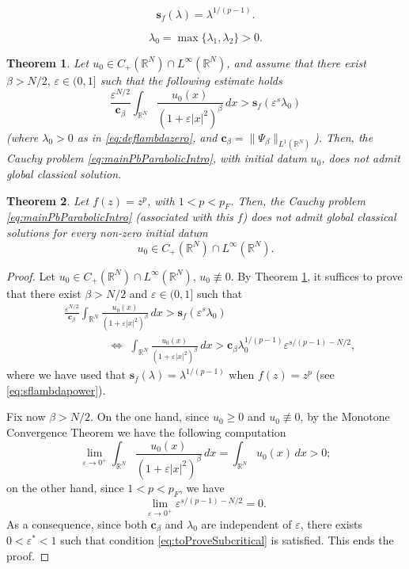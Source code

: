 \documentclass[10pt,a4paper]{amsart}
\newtheorem{theorem}{Theorem}
\def \R {\mathbb{R}}
\def \RN {\mathbb{R}^N}
\def \e {\varepsilon}
\begin{document}
\begin{equation} \label{eq:sflambdapower}
\mathbf{s}_f(\lambda) = \lambda^{1/(p-1)}.
\end{equation}

\begin{equation} \label{eq:deflambdazero}
\lambda_0 =  \max\{\lambda_1,\lambda_2\}> 0.	
\end{equation}

\begin{theorem} \label{thm:NonexistenceExplicit}
	Let $u_0\in C_+(\mathbb{R}^N)\cap L^\infty(\mathbb{R}^N)$, and assume that there exist $\beta > N/2,\,\e\in(0,1]$ such that the following
	estimate holds
	\begin{equation} \label{eq:conditionKaplanExplicit}
		\frac{\e^{N/2}}{\mathbf{c}_\beta}\int_{\R^N}\frac{u_0(x)}{(1+\e|x|^2)^\beta}\,dx >\mathbf{s}_f(\e^s\lambda_0)
	\end{equation}
	\emph{(}where $\lambda_0 > 0$ as in \eqref{eq:deflambdazero}, and
	$\mathbf{c}_\beta = \|\Psi_\beta\|_{L^1(\R^N)}$\emph{)}. Then, the Cauchy problem \eqref{eq:mainPbParabolicIntro}, with initial datum $u_0$, does not admit global classical solution.
\end{theorem}

\begin{theorem}\label{teo3}
Let $f(z) = z^p$, with $1<p<p_F$. Then, the Cauchy problem \eqref{eq:mainPbParabolicIntro}
\emph{(}associated with this $f$\emph{)} does not admit global classical solutions \emph{for every non-zero initial datum}
$$u_0\in C_+(\mathbb{R}^N)\cap L^\infty(\mathbb{R}^N).$$
\end{theorem}

\begin{proof}
	Let $u_0\in C_+(\mathbb{R}^N)\cap L^\infty(\mathbb{R}^N),\,u_0\not\equiv 0$. By Theorem \ref{thm:NonexistenceExplicit}, it suffices to prove that there exist $\beta > N/2$ and $\varepsilon\in(0,1]$ such that\begin{equation}\label{eq:toProveSubcritical}
\begin{split}
& \frac{\e^{N/2}}{\mathbf{c}_\beta}\int_{\R^N}\frac{u_0(x)}{(1+\e|x|^2)^\beta}\,dx >\mathbf{s}_f(\e^s \lambda_0)\\
&\qquad\qquad\Longleftrightarrow\,\,
	\int_{\R^N}\frac{u_0(x)}{(1+\e|x|^2)^\beta}\,dx >\mathbf{c}_\beta \lambda_0^{1/(p-1)}\e^{s/(p-1)-N/2},
\end{split}	
\end{equation}
where we have used  that $\mathbf{s}_f(\lambda) = \lambda^{1/(p-1)}$ when $f(z) = z^p$ (see \eqref{eq:sflambdapower}).
\vspace{0.1cm}

Fix now $\beta > N/2$. On the one hand, since $u_0\geq 0$ and $u_0\not\equiv 0$, by the Monotone Convergence Theorem we have the following computation
$$\lim_{\e\to 0^+}\int_{\R^N}\frac{u_0(x)}{(1+\e|x|^2)^\beta}\,dx =
\int_{\RN}u_0(x)\,dx > 0;$$
on the other hand, since $1<p<p_F$, we have
$$\lim_{\e\to 0^+}\e^{s/(p-1)-N/2} = 0.$$
As a consequence, since both $\mathbf{c}_\beta$ and $\lambda_0$ are  independent of $\e$, there exists $0<\e^*<1$ such that
condition \eqref{eq:toProveSubcritical} is satisfied. This ends the proof.
\end{proof}
\end{document}
